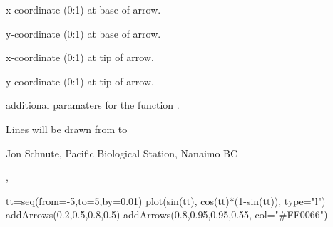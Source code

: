 \documentclass[letterpaper]{book}
\begin{document}
\begin{Arguments}
\begin{ldescription}
\item[\code{x1}] x-coordinate (0:1) at base of arrow.
\item[\code{y1}] y-coordinate (0:1) at base of arrow.
\item[\code{x2}] x-coordinate (0:1) at tip of arrow.
\item[\code{y2}] y-coordinate (0:1) at tip of arrow.
\item[\code{...}] additional paramaters for the function .
\end{ldescription}
\end{Arguments}
\begin{Details}\relax
Lines will be drawn from  to 
\end{Details}
\begin{Author}\relax
Jon Schnute, Pacific Biological Station, Nanaimo BC
\end{Author}
\begin{SeeAlso}\relax
{}, 
\end{SeeAlso}
\begin{Examples}
\begin{ExampleCode}
tt=seq(from=-5,to=5,by=0.01)
plot(sin(tt), cos(tt)*(1-sin(tt)), type="l")
addArrows(0.2,0.5,0.8,0.5)
addArrows(0.8,0.95,0.95,0.55, col="#FF0066")
\end{ExampleCode}
\end{Examples}
\end{document}
